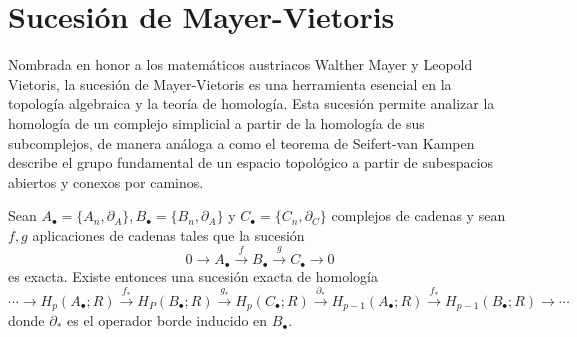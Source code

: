 \section{Sucesión de Mayer-Vietoris}
Nombrada en honor a los matemáticos austriacos Walther Mayer y Leopold Vietoris,
la sucesión de Mayer-Vietoris es una herramienta esencial en la topología
algebraica y la teoría de homología. Esta sucesión permite analizar la homología
de un complejo simplicial a partir de la homología de sus subcomplejos, de
manera análoga a como el teorema de Seifert-van Kampen describe el grupo
fundamental de un espacio topológico a partir de subespacios abiertos y conexos
por caminos.
\begin{lema}
	 \label{lem:zig-zag} Sean \(A_{\bullet}= \{A_{n},\partial_{A}
	\}, B_{\bullet}= \{B_{n},\partial_{A}\}\) y \(C_{\bullet}= \{C_{n},\partial_{C}\}\)
	complejos de cadenas y sean \(f,g\) aplicaciones de cadenas tales que la sucesión
	\[
		0 \to A_{\bullet}\overset{f}{\to}B_{\bullet}\overset{g}{\to}C_{\bullet}\to 0
	\]
	es exacta. Existe entonces una sucesión exacta de homología
	\begin{equation}
		\label{eq:long-exact-hom}\cdots \to H_{p}(A_{\bullet};R) \overset{f_*}{\to}H_{P}
		(B_{\bullet};R) \overset{g_*}{\to}H_{p}(C_{\bullet};R) \overset{\partial_*}{\to}
		H_{p-1}(A_{\bullet};R) \overset{f_*}{\to}H_{p-1}(B_{\bullet};R) \to \cdots
	\end{equation}
	donde \(\partial_{*}\) es el operador borde inducido en \(B_{\bullet}\).
\end{lema}
